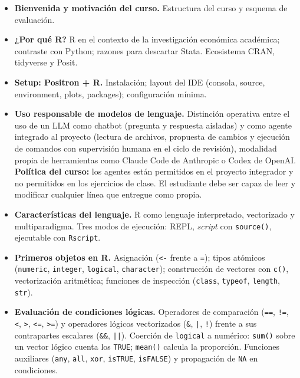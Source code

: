 \documentclass[11pt,letterpaper]{article}
\newcommand{\blue}[1]{{\color{cerulean}#1}}
\newcommand{\orange}[1]{{\color{redorange}#1}}
\begin{document}
\begin{itemize}[leftmargin=*, itemsep=2pt]
    \item \textbf{Bienvenida y motivación del curso.} Estructura del curso y esquema de evaluación.
    \item \textbf{¿Por qué R?} R en el contexto de la investigación económica académica; contraste con Python; razones para descartar Stata. Ecosistema CRAN, tidyverse y Posit.
    \item \textbf{Setup: Positron + R.} Instalación; layout del IDE (consola, source, environment, plots, packages); configuración mínima.
    \item \textbf{Uso responsable de modelos de lenguaje.} Distinción operativa entre el uso de un LLM como \blue{chatbot} (pregunta y respuesta aisladas) y como \orange{agente integrado al proyecto} (lectura de archivos, propuesta de cambios y ejecución de comandos con supervisión humana en el ciclo de revisión), modalidad propia de herramientas como Claude Code de Anthropic o Codex de OpenAI. \textbf{Política del curso:} los agentes están permitidos en el proyecto integrador y no permitidos en los ejercicios de clase. El estudiante debe ser capaz de leer y modificar cualquier línea que entregue como propia.
    \item \textbf{Características del lenguaje.} R como lenguaje interpretado, vectorizado y multiparadigma. Tres modos de ejecución: REPL, \textit{script} con \texttt{source()}, ejecutable con \texttt{Rscript}.
    \item \textbf{Primeros objetos en R.} Asignación (\texttt{<-} frente a \texttt{=}); tipos atómicos (\texttt{numeric}, \texttt{integer}, \texttt{logical}, \texttt{character}); construcción de vectores con \texttt{c()}, vectorización aritmética; funciones de inspección (\texttt{class}, \texttt{typeof}, \texttt{length}, \texttt{str}).
    \item \textbf{Evaluación de condiciones lógicas.} Operadores de comparación (\texttt{==}, \texttt{!=}, \texttt{<}, \texttt{>}, \texttt{<=}, \texttt{>=}) y operadores lógicos vectorizados (\texttt{\&}, \texttt{|}, \texttt{!}) frente a sus contrapartes escalares (\texttt{\&\&}, \texttt{||}). Coerción de \texttt{logical} a numérico: \texttt{sum()} sobre un vector lógico cuenta los \texttt{TRUE}; \texttt{mean()} calcula la proporción. Funciones auxiliares (\texttt{any}, \texttt{all}, \texttt{xor}, \texttt{isTRUE}, \texttt{isFALSE}) y propagación de \texttt{NA} en condiciones.
\end{itemize}
\end{document}
